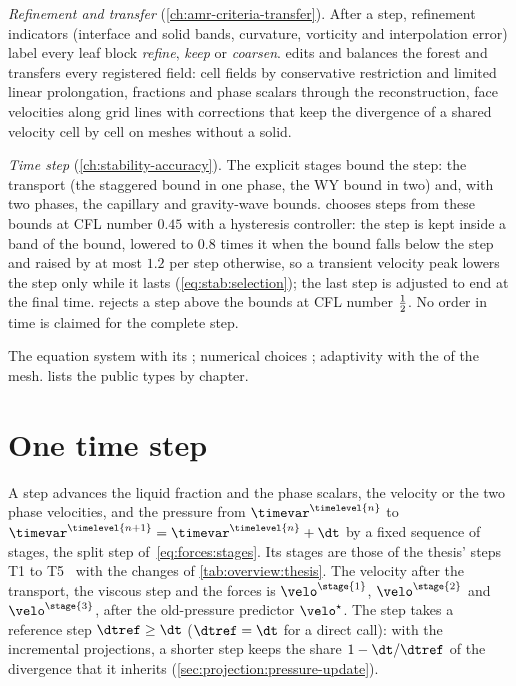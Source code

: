 \emph{Refinement and transfer} (\cref{ch:amr-criteria-transfer}). After a
step, refinement indicators (interface and solid bands, curvature, vorticity
and interpolation error) label every leaf block \emph{refine}, \emph{keep} or
\emph{coarsen}.  edits and balances the forest and transfers
every registered field: cell fields by conservative restriction and limited
linear prolongation, fractions and phase scalars through the reconstruction,
face velocities along grid lines with corrections that keep the divergence
of a shared velocity cell by cell on meshes without a solid.

\emph{Time step} (\cref{ch:stability-accuracy}). The explicit stages bound
the step: the transport (the staggered bound in one phase, the WY bound in
two) and, with two phases, the capillary and gravity-wave bounds.
 chooses steps from these bounds at CFL number $0.45$ with
a hysteresis controller: the step is kept inside a band of the bound, lowered
to $0.8$ times it when the bound falls below the step and raised by at most
$1.2$ per step otherwise, so a transient velocity peak lowers the step only
while it lasts (\cref{eq:stab:selection}); the last step is adjusted to end
at the final time.  rejects a step above the bounds at CFL
number $\frac{1}{2}$. No order in time is claimed for the complete step.

\begin{implnote}
The equation system  with its
; numerical choices
;
adaptivity  with the
 of the mesh.  lists
the public types by chapter.
\end{implnote}

\section{One time step}\label{sec:overview:step}
A step advances the liquid fraction and the phase scalars, the velocity or
the two phase velocities, and the pressure from $\timevar^{\timelevel{n}}$ to
$\timevar^{\timelevel{n+1}}=\timevar^{\timelevel{n}}+\dt$ by a fixed sequence of
stages, the split step of~\cref{eq:forces:stages}. Its stages are those of
the thesis' steps T1 to T5~ with the changes of
\cref{tab:overview:thesis}. The velocity after the transport, the viscous
step and the forces is $\velo^{\stage{1}}$, $\velo^{\stage{2}}$ and
$\velo^{\stage{3}}$, after the old-pressure predictor $\velo^{\star}$. The
step takes a reference step $\dtref\ge\dt$ ($\dtref=\dt$ for a direct call):
with the incremental projections, a shorter step keeps the share
$1-\dt/\dtref$ of the divergence that it inherits
(\cref{sec:projection:pressure-update}).

